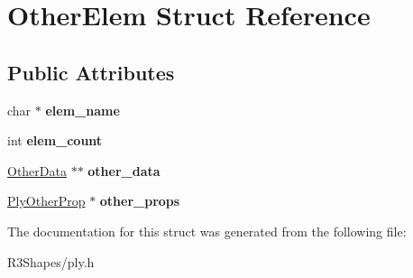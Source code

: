 \hypertarget{struct_other_elem}{}\section{Other\+Elem Struct Reference}
\label{struct_other_elem}
\subsection*{Public Attributes}
\begin{DoxyCompactItemize}
\item 
char $\ast$ {\bfseries elem\+\_\+name}\hypertarget{struct_other_elem_a86011b3e2b292c7354ff8d39ab6e38f4}{}\label{struct_other_elem_a86011b3e2b292c7354ff8d39ab6e38f4}

\item 
int {\bfseries elem\+\_\+count}\hypertarget{struct_other_elem_ae94cc7f40247728d5d98971685ff35e3}{}\label{struct_other_elem_ae94cc7f40247728d5d98971685ff35e3}

\item 
\hyperlink{struct_other_data}{Other\+Data} $\ast$$\ast$ {\bfseries other\+\_\+data}\hypertarget{struct_other_elem_a3dec65c2ba1b4c206ac9f3d02ec4b935}{}\label{struct_other_elem_a3dec65c2ba1b4c206ac9f3d02ec4b935}

\item 
\hyperlink{struct_ply_other_prop}{Ply\+Other\+Prop} $\ast$ {\bfseries other\+\_\+props}\hypertarget{struct_other_elem_aa800ba93c6711ef9da7be0d3cf032263}{}\label{struct_other_elem_aa800ba93c6711ef9da7be0d3cf032263}

\end{DoxyCompactItemize}


The documentation for this struct was generated from the following file\+:\begin{DoxyCompactItemize}
\item 
R3\+Shapes/ply.\+h\end{DoxyCompactItemize}

